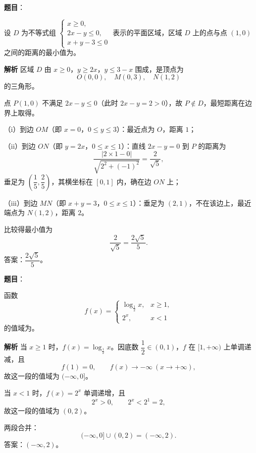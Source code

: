 \begin{answer}

\textbf{题目}：

设 $D$ 为不等式组 $\begin{cases}x\geqslant0,\\2x-y\leqslant0,\\x+y-3\leqslant0\end{cases}$ 表示的平面区域，区域 $D$ 上的点与点 $(1,0)$ 之间的距离的最小值为\gkblank{}。

\textbf{解析}
区域 $D$ 由 $x\geqslant0$，$y\geqslant2x$，$y\leqslant3-x$ 围成，是顶点为
\nopagebreak[4]
\[O(0,0),\quad M(0,3),\quad N(1,2)\]
的三角形。

点 $P(1,0)$ 不满足 $2x-y\leqslant0$（此时 $2x-y=2>0$），故 $P\notin D$，最短距离在边界上取得。

（i）到边 $OM$（即 $x=0$，$0\leqslant y\leqslant3$）：最近点为 $O$，距离 $1$；

（ii）到边 $ON$（即 $y=2x$，$0\leqslant x\leqslant1$）：直线 $2x-y=0$ 到 $P$ 的距离为
\nopagebreak[4]
\[\frac{|2\times1-0|}{\sqrt{2^2+(-1)^2}}=\frac2{\sqrt5},\]
垂足为 $\left(\dfrac15,\dfrac25\right)$，其横坐标在 $[0,1]$ 内，确在边 $ON$ 上；

（iii）到边 $MN$（即 $x+y=3$，$0\leqslant x\leqslant1$）：垂足为 $(2,1)$，不在该边上，最近端点为 $N(1,2)$，距离 $2$。

比较得最小值为
\nopagebreak[4]
\[\frac2{\sqrt5}=\frac{2\sqrt5}5.\]
答案：$\dfrac{2\sqrt5}5$。


\end{answer}
\begin{answer}

\textbf{题目}：

函数
\nopagebreak[4]
\[f(x)=\begin{cases}\log_{\frac12}x,&x\geqslant1,\\2^x,&x<1\end{cases}\]
的值域为\gkblank{}。

\textbf{解析}
当 $x\geqslant1$ 时，$f(x)=\log_{\frac12}x$。因底数 $\dfrac12\in(0,1)$，$f$ 在 $[1,+\infty)$ 上单调递减，且
\nopagebreak[4]
\[f(1)=0,\qquad f(x)\to-\infty\ (x\to+\infty),\]
故这一段的值域为 $(-\infty,0]$。

当 $x<1$ 时，$f(x)=2^x$ 单调递增，且
\nopagebreak[4]
\[2^x>0,\qquad 2^x<2^1=2,\]
故这一段的值域为 $(0,2)$。

两段合并：
\nopagebreak[4]
\[(-\infty,0]\cup(0,2)=(-\infty,2).\]
答案：$(-\infty,2)$。


\end{answer}
